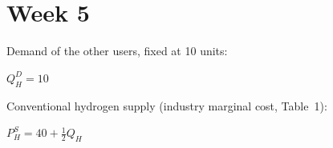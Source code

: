 \documentclass{beamer}
\newcommand{\showanswers}{0}
\begin{document}
\section{Week 5}

\newenvironment{wfive}{\noindent\hspace*{-0.6cm}\begin{minipage}{12cm}\Large\raggedright\setlength{\parindent}{0pt}}{\end{minipage}\hspace*{-0.6cm}}
\newcommand{\wfl}[1]{\par #1\par\nobreak\vspace{3pt}}
\newcommand{\wfe}[1]{{\par\leftskip=1cm\relax $\displaystyle #1$\par}\vspace{8pt}}
\newcommand{\wfc}[2]{{\par\leftskip=1cm\relax\hangindent=1cm\hangafter=1 $\displaystyle #1$\quad #2\par}\vspace{5pt}}
\newcommand{\wft}[1]{{\par\leftskip=1cm\relax #1\par}\vspace{5pt}}

\begin{frame}[plain,label=w5_eq_1_1a]
  \begin{wfive}
    \wfl{Demand of the other users, fixed at 10 units:}
    \wfe{Q_H^D = 10}
    \wfl{Conventional hydrogen supply (industry marginal cost, Table~1):}
    \wfe{P_H^S = 40 + \tfrac12Q_H}
  \end{wfive}
\end{frame}
\end{document}
